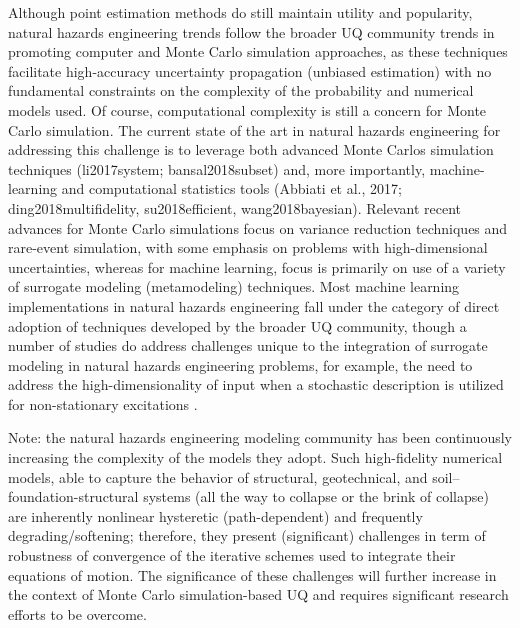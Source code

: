 Although point estimation methods do still maintain utility and popularity, natural hazards engineering trends follow the broader UQ community trends in promoting computer and Monte Carlo simulation approaches, as these techniques facilitate high-accuracy uncertainty propagation (unbiased estimation) with no fundamental constraints on the complexity of the probability and numerical models used. Of course, computational complexity is still a concern for Monte Carlo simulation. The current state of the art in natural hazards engineering for addressing this challenge is to leverage both advanced Monte Carlos simulation techniques (li2017system; bansal2018subset) and, more importantly, machine-learning and computational statistics tools (Abbiati et al., 2017; ding2018multifidelity, su2018efficient, wang2018bayesian). Relevant recent advances for Monte Carlo simulations focus on variance reduction techniques and rare-event simulation, with some emphasis on problems with high-dimensional uncertainties, whereas for machine learning, focus is primarily on use of a variety of surrogate modeling (metamodeling) techniques. Most machine learning implementations in natural hazards engineering fall under the category of direct adoption of techniques developed by the broader UQ community, though a number of studies do address challenges unique to the integration of surrogate modeling in natural hazards engineering problems, for example, the need to address the high-dimensionality of input when a stochastic description is utilized for non-stationary excitations \citep{gidaris2015kriging}.

Note: the natural hazards engineering modeling community has been continuously increasing the complexity of the models they adopt. Such high-fidelity numerical models, able to capture the behavior of structural, geotechnical, and soil–foundation-structural systems (all the way to collapse or the brink of collapse) are inherently nonlinear hysteretic (path-dependent) and frequently degrading/softening; therefore, they present (significant) challenges in term of robustness of convergence of the iterative schemes used to integrate their equations of motion. The significance of these challenges will further increase in the context of Monte Carlo simulation-based UQ and requires significant research efforts to be overcome.

